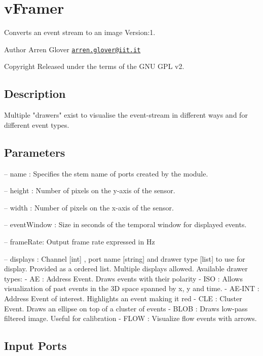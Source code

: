 \hypertarget{group__vFramer}{}\section{v\+Framer}
\label{group__vFramer}
Converts an event stream to an image Version\+:1. \begin{DoxyAuthor}{Author}
Arren Glover \href{mailto:arren.glover@iit.it}{\tt arren.\+glover@iit.\+it} ~\newline
 
\end{DoxyAuthor}
\begin{DoxyCopyright}{Copyright}
Released under the terms of the G\+NU G\+PL v2. 
\end{DoxyCopyright}
\hypertarget{group__zynqGrabber_intro_sec}{}\subsection{Description}\label{group__zynqGrabber_intro_sec}
\begin{DoxyVerb} Multiple "drawers" exist to visualise the event-stream in different ways and for different event types.
\end{DoxyVerb}
\hypertarget{group__zynqGrabber_parameters_sec}{}\subsection{Parameters}\label{group__zynqGrabber_parameters_sec}

\begin{DoxyItemize}
\item -- name \+: Specifies the stem name of ports created by the module.
\item -- height \+: Number of pixels on the y-\/axis of the sensor.
\item -- width \+: Number of pixels on the x-\/axis of the sensor.
\item -- event\+Window \+: Size in seconds of the temporal window for displayed events.
\item -- frame\+Rate\+: Output frame rate expressed in Hz
\item -- displays \+: Channel \mbox{[}int\mbox{]} , port name \mbox{[}string\mbox{]} and \textquotesingle{}drawer\textquotesingle{} type \mbox{[}list\mbox{]} to use for display. Provided as a ordered list. Multiple displays allowed. Available drawer types\+: -\/ AE \+: Address Event. Draws events with their polarity -\/ I\+SO \+: Allows visualization of past events in the 3D space spanned by x, y and time. -\/ A\+E-\/\+I\+NT \+: Address Event of interest. Highlights an event making it red -\/ C\+LE \+: Cluster Event. Draws an ellipse on top of a cluster of events -\/ B\+L\+OB \+: Draws low-\/pass filtered image. Useful for calibration -\/ F\+L\+OW \+: Visualize flow events with arrows. 
\end{DoxyItemize}\hypertarget{group__zynqGrabber_inputports_sec}{}\subsection{Input Ports}\label{group__zynqGrabber_inputports_sec}

